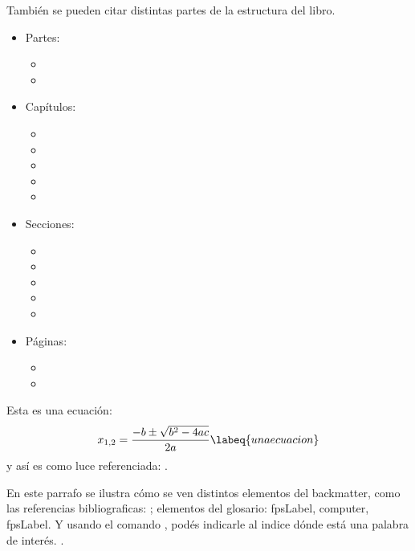 También se pueden citar distintas partes de la estructura del libro.
\begin{itemize}
    \item Partes:
    \begin{itemize}
        \item {}
        \item {}
    \end{itemize}
    \item Capítulos:
    \begin{itemize}
        \item {}
        \item {}
        \item {}
        \item {}
        \item {}
    \end{itemize}
    \item Secciones:
    \begin{itemize}
        \item {}
        \item {}
        \item {}
        \item {}
        \item {}
    \end{itemize}
    \item Páginas:
    \begin{itemize}
        \item {}
        \item {}
    \end{itemize}
\end{itemize}

Esta es una ecuación:
\begin{equation}
    x_{1,2}=\frac{-b\pm\sqrt{b^2-4ac}}{2a}
    \labeq{unaecuacion}
\end{equation}
y así es como luce referenciada: .

En este parrafo se ilustra cómo se ven distintos elementos del backmatter, como las referencias bibliograficas: ; elementos del glosario: \acrfull{fpsLabel}, \gls{computer}, \acrshort{fpsLabel}. Y usando el comando , podés indicarle al indice dónde está una palabra de interés. .




